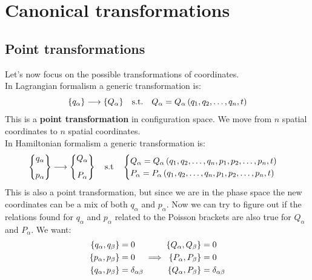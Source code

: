 \chapter{Canonical transformations}
\section{Point transformations}
Let's now focus on the possible transformations of coordinates.\\
In Lagrangian formalism a generic transformation is:
\begin{equation}
    \{q_{\alpha}\} \longrightarrow \{Q_{\alpha}\}\quad \text{s.t.}\quad Q_{\alpha} = Q_{\alpha}\left(q_1,q_2,\dots,q_n,t\right)
\end{equation}
This is a \textbf{point transformation} in configuration space. We move from $n$ spatial coordinates to $n$ spatial coordinates.\\
In Hamiltonian formalism a generic transformation is:
\begin{equation}
    \begin{Bmatrix}
        q_{\alpha}\\[8pt]
        p_{\alpha}
    \end{Bmatrix} \longrightarrow
    \begin{Bmatrix}
        Q_{\alpha}\\[8pt]
        P_{\alpha}
    \end{Bmatrix}\quad \text{s.t} \quad
    \begin{cases}
        Q_{\alpha} = Q_{\alpha}\left(q_1,q_2,\dots,q_n,p_1,p_2,\dots,p_n,t\right)\\
        P_{\alpha} = P_{\alpha}\left(q_1,q_2,\dots,q_n,p_1,p_2,\dots,p_n,t\right)
    \end{cases}
\end{equation}
This is also a point transformation, but since we are in the phase space the new coordinates can be a mix of both $q_{\alpha}$ and $p_{\alpha}$. Now we can try to figure out if the relations found for $q_{\alpha}$ and $p_{\alpha}$ related to the Poisson brackets are also true for $Q_{\alpha}$ and $P_{\alpha}$.
We want:
\begin{equation}
    \begin{split}
        \pb{q_{\alpha}}{q_{\beta}} &= 0\\
        \pb{p_{\alpha}}{p_{\beta}} &= 0\\
        \pb{q_{\alpha}}{p_{\beta}} &= \delta_{\alpha \beta}
    \end{split} \implies
    \begin{split}
        \pb{Q_{\alpha}}{Q_{\beta}} &= 0\\
        \pb{P_{\alpha}}{P_{\beta}} &= 0\\
        \pb{Q_{\alpha}}{P_{\beta}} &= \delta_{\alpha \beta}
    \end{split}
\end{equation}
